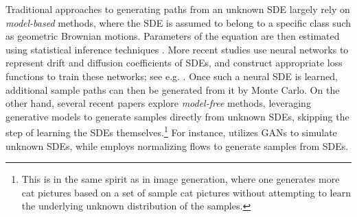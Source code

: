 \documentclass[11pt]{article}
\begin{document}
Traditional approaches to generating paths from an unknown SDE largely rely on {\it model-based} methods, where the SDE is assumed to belong to a specific class such as geometric Brownian motions. Parameters of the equation are then estimated using statistical inference techniques \citep{iacus2008simulation, kessler2012statistical}. More recent studies use neural networks to represent drift and diffusion coefficients of SDEs, and construct appropriate loss functions to train these networks; see e.g. \cite{kidger2021neural, zhu2024dyngma}. Once such a neural SDE is learned, additional sample paths can then be generated from it by Monte Carlo. On the other hand, several recent papers explore {\it model-free} methods, leveraging generative models to generate samples directly from unknown SDEs, skipping the step of learning the SDEs themselves.\footnote{This is in the same spirit as in image generation, where one generates more cat pictures based on a set of sample cat pictures without attempting to learn the underlying unknown distribution of the samples.}  For instance, \cite{van2023monte} utilizes GANs \citep{goodfellow2014generative} to simulate unknown SDEs, while \cite{yang2024pseudoreversible} employs normalizing flows to generate samples from SDEs.
\end{document}
